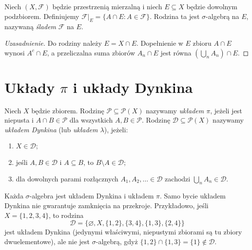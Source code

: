 \begin{definicja}\label{idx:01:definicja:04}

Niech $(X,\mathcal F)$ będzie przestrzenią mierzalną i niech
$E\subseteq X$ będzie dowolnym podzbiorem. Definiujemy
$\mathcal F|_E=\{A\cap E:A\in\mathcal F\}$.
Rodzina ta jest $\sigma$-algebrą na $E$, nazywaną \emph{śladem}
$\mathcal F$ na $E$.
\end{definicja}
\begin{proof}[Uzasadnienie]
Do rodziny należy $E=X\cap E$. Dopełnienie w $E$ zbioru $A\cap E$
wynosi $A^c\cap E$, a przeliczalna suma zbiorów $A_n\cap E$ jest równa
$(\bigcup_n A_n)\cap E$.
\end{proof}

\section{Układy \texorpdfstring{$\pi$}{pi} i układy Dynkina}

\begin{definicja}
\label{def:pi-lambda}
Niech $X$ będzie zbiorem. Rodzinę $\mathcal P\subseteq\mathcal P(X)$
nazywamy \emph{układem $\pi$}, jeżeli jest niepusta i
$A\cap B\in\mathcal P$ dla wszystkich $A,B\in\mathcal P$.
Rodzinę $\mathcal D\subseteq\mathcal P(X)$ nazywamy \emph{układem
Dynkina} (lub \emph{układem $\lambda$}), jeżeli:
\begin{enumerate}
\item $X\in\mathcal D$;
\item jeśli $A,B\in\mathcal D$ i $A\subseteq B$, to $B\setminus A\in\mathcal D$;
\item dla dowolnych parami rozłącznych $A_1,A_2,\ldots\in\mathcal D$
zachodzi $\bigcup_nA_n\in\mathcal D$.
\end{enumerate}
\end{definicja}

Każda $\sigma$-algebra jest układem Dynkina i układem $\pi$.
Samo bycie układem Dynkina nie gwarantuje zamknięcia na przekroje.
Przykładowo, jeśli $X=\{1,2,3,4\}$, to rodzina
\[
\mathcal D=\{\varnothing,X,\{1,2\},\{3,4\},\{1,3\},\{2,4\}\}
\]
jest układem Dynkina (jedynymi właściwymi, niepustymi zbiorami są tu
zbiory dwuelementowe), ale nie jest $\sigma$-algebrą, gdyż
$\{1,2\}\cap\{1,3\}=\{1\}\notin\mathcal D$.


